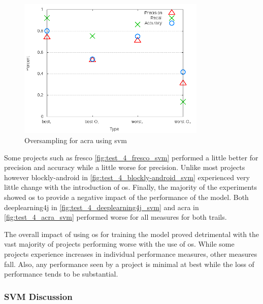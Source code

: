 \begin{figure}[!ht]
    \centering

        \includegraphics[width=0.8\textwidth]{images/svm/test_4/acra_sample_range}
        \caption{Oversampling for acra using \gls{svm}}
        \label{fig:test_4_acra_svm}
\end{figure}


Some projects such as fresco \autoref{fig:test_4_fresco_svm} performed a little better for precision and accuracy while a little worse for precision. Unlike most projects however blockly-android in \autoref{fig:test_4_blockly-android_svm} experienced very little change with the introduction of \gls{os}. Finally, the majority of the experiments showed \gls{os} to provide a negative impact of the performance of the model. Both deeplearning4j in \autoref{fig:test_4_deeplearning4j_svm} and acra in \autoref{fig:test_4_acra_svm} performed worse for all measures for both trails.

The overall impact of using \gls{os} for training the model proved detrimental with the vast majority of projects performing worse with the use of \gls{os}. While some projects experience increases in individual performance measures, other measures fall. Also, any performance seen by a project is minimal at best while the loss of performance tends to be substantial. 

\subsubsection{SVM Discussion}
\label{subsec:svm_discussion}

